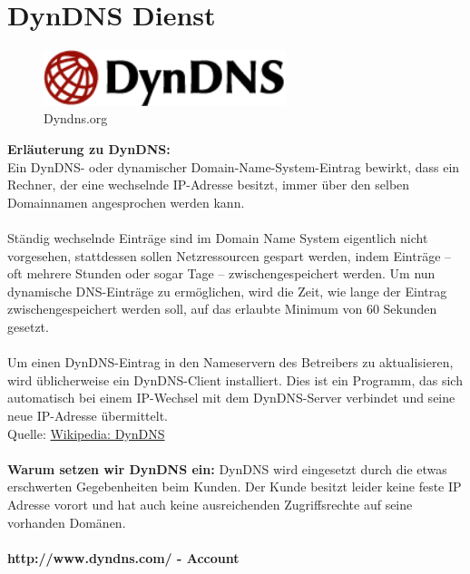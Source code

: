 \chapter{DynDNS Dienst}  %
\label{chapter:DynDNS Dienst}  %

\begin{figure}[h]
\begin{center}
   \includegraphics[width=200pt]{../bilder/dyndns.png}
   \caption{Dyndns.org}
   \label{DynDNS.org}
\end{center}
\end{figure}
\textbf{Erläuterung zu DynDNS:} \\
Ein DynDNS- oder dynamischer Domain-Name-System-Eintrag bewirkt, dass ein Rechner, der eine wechselnde IP-Adresse besitzt, immer über den selben Domainnamen angesprochen werden kann.\\
\\
Ständig wechselnde Einträge sind im Domain Name System eigentlich nicht vorgesehen, stattdessen sollen Netzressourcen gespart werden, indem Einträge – oft mehrere Stunden oder sogar Tage – zwischengespeichert werden. Um nun dynamische DNS-Einträge zu ermöglichen, wird die Zeit, wie lange der Eintrag zwischengespeichert werden soll, auf das erlaubte Minimum von 60 Sekunden gesetzt.\\
\\
Um einen DynDNS-Eintrag in den Nameservern des Betreibers zu aktualisieren, wird üblicherweise ein DynDNS-Client installiert. Dies ist ein Programm, das sich automatisch bei einem IP-Wechsel mit dem DynDNS-Server verbindet und seine neue IP-Adresse übermittelt.
\\
Quelle: \href{http://de.Wikipedia.org/wiki/DynDNS}{Wikipedia: DynDNS} \\
\\
\textbf{Warum setzen wir DynDNS ein:}
DynDNS wird eingesetzt durch die etwas erschwerten Gegebenheiten beim Kunden. Der Kunde besitzt leider keine feste IP Adresse vorort und hat auch keine ausreichenden Zugriffsrechte auf seine vorhanden Domänen.\\
\\
\textbf{http://www.dyndns.com/ - Account}
